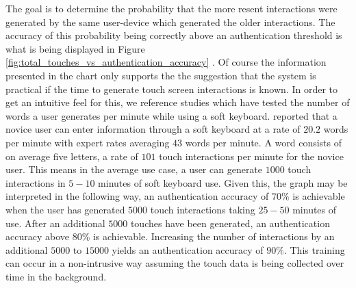 %
%
The goal is to determine the probability that
the more resent interactions
were generated by the same user-device which
generated the older interactions.
%
The accuracy of this probability
being correctly above an authentication threshold 
is what is being displayed in 
Figure 
\ref{fig:total_touches_vs_authentication_accuracy}
.
%
Of course
the information presented in the chart 
only supports the
the suggestion that the system is practical 
if the time to generate touch screen interactions is known.
%
In order to get an intuitive feel for this,
we reference studies which have tested
the number of words a user generates per minute
while using a soft keyboard.
%
\cite{mackenzie1999text} reported that a
novice user can enter information through 
a soft keyboard at a rate of $20.2$ words per minute with
expert rates averaging $43$ words per minute.
%
A word consists of on average five letters, 
a rate of $101$ touch interactions per minute for the novice user.
%
This means in the average use case, 
a user can generate $1000$ touch interactions in $5-10$ minutes of 
soft keyboard use.
%
Given this,
the graph may be interpreted in the following way,
an authentication accuracy of $70\%$ is achievable 
when the user has generated $5000$ touch interactions
taking $25-50$ minutes of use.
%
After an additional $5000$ touches have been generated,
an authentication accuracy above $80\%$ is achievable.
Increasing the number of interactions 
by an additional $5000$ to $15000$ yields
an authentication accuracy of $90\%$.
%
This training can occur in a non-intrusive way
assuming the touch data is being collected over time in the background.




